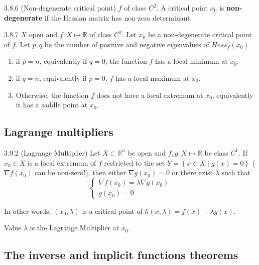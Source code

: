 \documentclass[8pt,a4paper,twocolumn,table]{extarticle}
\newcommand{\R}{\mathbb{R}}
\begin{document}
\begin{definition}{3.8.6 (Non-degenerate critical point)}
    $f$ of class $C^2$. A critical point $x_0$ is \textbf{non-degenerate} if the Hessian matrix has non-zero determinant.
\end{definition}

\begin{corollary}{3.8.7}
    $X$ open and $f: X \mapsto \R$ of class $C^2$. Let $x_0$ be a non-degenerate critical point of $f$. Let $p, q$ be the number of positive and negative eigenvalues of $Hess_f (x_0)$
    \begin{enumerate}
        \item if $p = n$, equivalently if $q = 0$, the function $f$ has a local minimum at $x_0$.
        \item if $q = n$, equivalently if $p = 0$, $f$ has a local maximum at $x_0$.
        \item Otherwise, the function $f$ does not have a local extremum at $x_0$, equivalently it has a saddle point at $x_0$.
    \end{enumerate}
\end{corollary}

\subsection{Lagrange multipliers}

\begin{proposition}{3.9.2 (Lagrange Multiplier)}
    Let $X \subset \R^n$ be open and $f,g: X \mapsto \R$ be class $C^1$.
    If $x_0 \in X$ is a local extremum of $f$ restricted to the set
    $Y = \left\{ x \in X \mid g(x) = 0 \right\}$ ($\nabla f(x_0)$ can be non-zero!),
    then either $\nabla g(x_0) = 0$ or there exist $\lambda$ such that
    \[ \begin{cases}
            \nabla f(x_0) = \lambda \nabla g(x_0) \\
            g(x_0) = 0
        \end{cases} \]

    In other words, $(x_0, \lambda)$ is a critical point of $h(x, \lambda) = f(x) - \lambda g(x)$.

    Value $\lambda$ is the Lagrange Multiplier at $x_0$.
\end{proposition}

\subsection{The inverse and implicit functions theorems}
\end{document}
